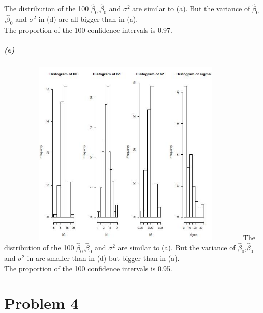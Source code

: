 \documentclass{article}
\begin{document}
\newline
The distribution of the 100  $\hat{\beta}_0$,$\hat{\beta}_0$ and $\sigma^2$ are similar to (a). But the variance of  $\hat{\beta}_0$,$\hat{\beta}_0$ and $\sigma^2$ in (d) are all bigger than in (a).\\
The proportion of the 100 confidence intervals is 0.97.
\subparagraph{(e)}~{}
\newline
\includegraphics[height=9cm,width=12cm]{35.jpg}
\newline
The distribution of the 100  $\hat{\beta}_0$,$\hat{\beta}_0$ and $\sigma^2$ are similar to (a). But the variance of  $\hat{\beta}_0$,$\hat{\beta}_0$ and $\sigma^2$ in are smaller than in (d) but bigger than in (a).\\
The proportion of the 100 confidence intervals is 0.95.
\section{Problem 4}
\end{document}
